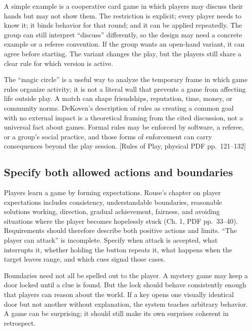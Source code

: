 A simple example is a cooperative card game in which players may discuss their hands but may not show them. The restriction is explicit; every player needs to know it; it binds behavior for that round; and it can be applied repeatedly. The group can still interpret ``discuss'' differently, so the design may need a concrete example or a referee convention. If the group wants an open-hand variant, it can agree before starting. The variant changes the play, but the players still share a clear rule for which version is active.

The ``magic circle'' is a useful way to analyze the temporary frame in which game rules organize activity; it is not a literal wall that prevents a game from affecting life outside play. A match can shape friendships, reputation, time, money, or community norms. DeKoven's description of rules as creating a common goal with no external impact is a theoretical framing from the cited discussion, not a universal fact about games. Formal rules may be enforced by software, a referee, or a group's social practice, and those forms of enforcement can carry consequences beyond the play session. {[}Rules of Play, physical PDF pp.~121--132{]}

\subsection{Specify both allowed actions and boundaries}\label{05-engine-i-ch009-specify-both-allowed-actions-and-boundaries}

Players learn a game by forming expectations. Rouse's chapter on player expectations includes consistency, understandable boundaries, reasonable solutions working, direction, gradual achievement, fairness, and avoiding situations where the player becomes hopelessly stuck (Ch. 1, PDF pp.~33--40). Requirements should therefore describe both positive actions and limits. ``The player can attack'' is incomplete. Specify when attack is accepted, what interrupts it, whether holding the button repeats it, what happens when the target leaves range, and which cues signal those cases.

Boundaries need not all be spelled out to the player. A mystery game may keep a door locked until a clue is found. But the lock should behave consistently enough that players can reason about the world. If a key opens one visually identical door but not another without explanation, the system teaches arbitrary behavior. A game can be surprising; it should still make its own surprises coherent in retrospect.

